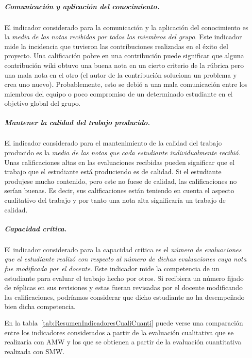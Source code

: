 			\subparagraph*{Comunicación y aplicación del conocimiento.}
			El indicador considerado para la comunicación y la aplicación del conocimiento es la \emph{media de las notas recibidas por todos los miembros del grupo}. Este indicador mide la incidencia que tuvieron las contribuciones realizadas en el éxito del proyecto. Una calificación pobre en una contribución puede significar  que alguna contribución wiki obtuvo una buena nota en un cierto criterio de la rúbrica pero una mala nota en el otro (el autor de la contribución soluciona un problema y crea uno nuevo). Probablemente, esto se debió a una mala comunicación entre los miembros del equipo o poco compromiso de un determinado estudiante en el objetivo global del grupo. 

			\subparagraph*{Mantener la calidad del trabajo producido.}
			El indicador considerado para el mantenimiento de la calidad del trabajo producido es la \emph{media de las notas que cada estudiante individualmente recibió}. Unas calificaciones altas en las evaluaciones recibidas pueden significar que el trabajo que el estudiante está produciendo es de calidad. Si el estudiante produjese mucho contenido, pero este no fuese de calidad, las calificaciones no serían buenas. Es decir, sus calificaciones están teniendo en cuenta el aspecto cualitativo del trabajo y por tanto una nota alta significaría un trabajo de calidad.

			\subparagraph*{Capacidad crítica.}
			El indicador considerado para la capacidad crítica es el \emph{número de evaluaciones que el estudiante realizó con respecto al número de dichas evaluaciones cuya nota fue modificada por el docente}. Este indicador mide la competencia de un estudiante para evaluar el trabajo hecho por otros. Si recibiera un número fijado de réplicas en sus revisiones y estas fueran revisadas por el docente modificando las calificaciones, podríamos considerar que dicho estudiante no ha desempeñado bien dicha competencia.

			En la tabla~\ref{tab:ResumenIndicadoresCualiCuanti} puede verse una comparación entre los indicadores considerados a partir de la evaluación cualitativa que se realizaría con AMW y los que se obtienen a partir de la evaluación cuantitativa realizada con SMW.

